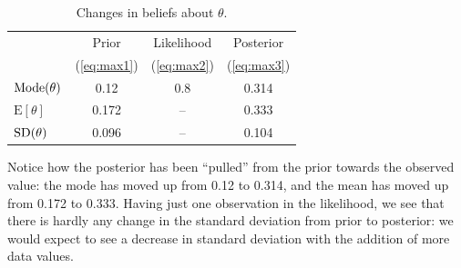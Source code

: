 {\begin{figure}[h!]
\end{figure}
\begin{table}[h!]
\bigskip

\begin{tabular}{|l|c|c|c|}
\cline{2-4}
\multicolumn{1}{c|}{~}& Prior & Likelihood & Posterior \\
\multicolumn{1}{c|}{~}& (\ref{eq:max1}) & (\ref{eq:max2}) &(\ref{eq:max3}) \\
\hline
$\textnormal{Mode}(\theta)$ & 0.12 & 0.8 & 0.314 \\
$\text{E}[\theta]$ & 0.172 & -- & 0.333 \\
$\textnormal{SD}(\theta)$ & 0.096 & -- & 0.104 \\
\hline
\end{tabular}
\caption{Changes in beliefs about $\theta$.}


\end{table}

Notice how the posterior has been ``pulled'' from the prior towards the observed value: the mode has moved up from 0.12 to 0.314, and the mean has moved up from 0.172 to 0.333.  Having just one observation in the likelihood, we see that there is hardly any change in the standard deviation from prior to posterior: we would expect to see a decrease in standard deviation with the addition of more data values.}


\newpage

